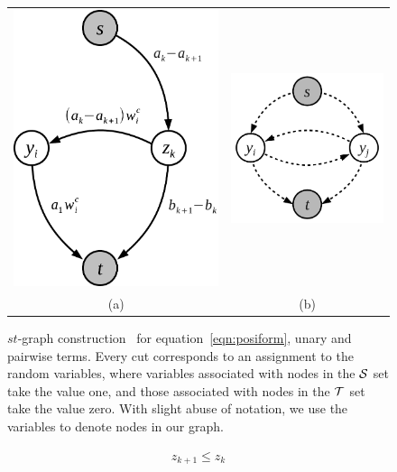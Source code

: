 \documentclass[sigconf, anonymous, review]{acmart}
\renewcommand{\cite}{\citep}
\begin{document}
\begin{figure}[t]
  \centering
  \setlength{\tabcolsep}{2pt}
  \begin{tabular}{cc}
    \includegraphics[width=0.45\columnwidth]{Methodology/figures/stmincut}&
                                                                         \includegraphics[width=0.5\columnwidth]{Methodology/figures/unary_pairwise.png}\\
                                                                         {\small (a)} & {\small (b)} 
  \end{tabular}
  \caption{\label{fig:stmincut} $st$-graph
    construction~\cite{gouldlearning} for
    equation~\eqref{eqn:posiform}, unary and pairwise terms.
    Every cut corresponds to an assignment to the random
    variables, where variables associated with nodes in the
    ${\cal S}$ set take the value one, and those associated with
    nodes in the ${\cal T}$ set take the value zero. With slight abuse
    of notation, we use the variables to denote nodes in our
    graph.}
\end{figure}

\begin{align}
  \label{eq:z_consecutive_constraint}
  z_{k+1} \leq z_k
\end{align}
\end{document}
